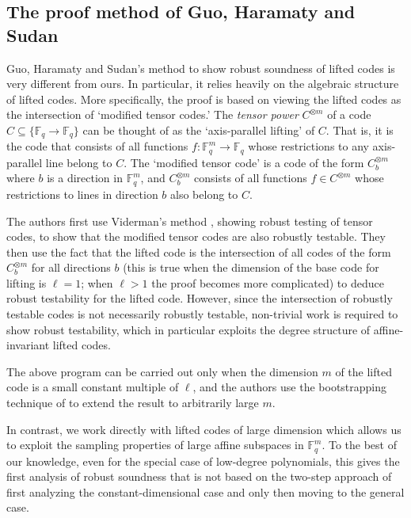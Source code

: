 \documentclass[11pt]{article}
\numberwithin{equation}{section}
\theoremstyle{definition}
\theoremstyle{plain}
\theoremstyle{plain}
\newcommand{\F}{{\mathbb{F}}}
\begin{document}
\subsection{The proof method of Guo, Haramaty and Sudan}\label{subsec:proof-prev}

%
Guo, Haramaty and Sudan's method \cite{GuoHS2015} %
%
to show  %
robust soundness of lifted codes is very different from ours. In particular, it relies heavily on the algebraic structure of lifted codes. More specifically, the proof is based on viewing the lifted codes as the intersection of
`modified tensor codes.'  %
%
%
The \emph{tensor power}   %
$C^{\otimes m}$ of a code $C \subseteq \{ \F_q \to \F_q\}$ can be 
thought of as the
`axis-parallel lifting'  %
of $C$. That is, it is the code that consists of all functions
 $f: \F_q^m \to \F_q$ whose restrictions to
any axis-parallel line belong to $C$. The
`modified tensor code'   %
is a code of the form $C^{\otimes m}_{b}$ where $b$ is a direction in $\F_q^m$,
and $C^{\otimes m}_{b}$ consists of all functions $f \in C^{\otimes m}$ whose 
restrictions to lines in direction $b$  also belong to $C$.

%
%
The authors first use Viderman's method \cite{Viderman2015}, %
showing robust testing of tensor codes, to show that the modified tensor codes are also robustly testable. They then use the fact that the lifted code is the intersection of all codes of the form $C^{\otimes m}_{b}$ for all directions $b$ (this is true when the dimension of the base code for lifting is $\ell=1$; when $\ell >1$ the proof becomes more complicated) to deduce robust testability for the lifted code. However, since
the  %
intersection of robustly testable codes is not necessarily robustly testable, %
non-trivial work is required to show robust testability, which in particular exploits the degree structure of affine-invariant lifted codes.

The above program can be carried out only when the dimension $m$ of the lifted code is a small constant multiple of $\ell$, and the authors use the
%
%
%
bootstrapping technique of
\cite{RubinfeldS1996,AroraLMSS1998,AroraS2003,Arora1994} 
to extend the result to
%
arbitrarily   %
large $m$.

In contrast, we work directly with lifted codes of large dimension which allows us to exploit the sampling  properties of large affine subspaces in $\F_q^m$. To the best of our knowledge, even for the special case of low-degree polynomials, this gives the first
analysis of robust soundness that  is not
based on the %
two-step   %
approach of first analyzing the
constant-dimensional %
case and only then moving to the general
%
case.
\end{document}
